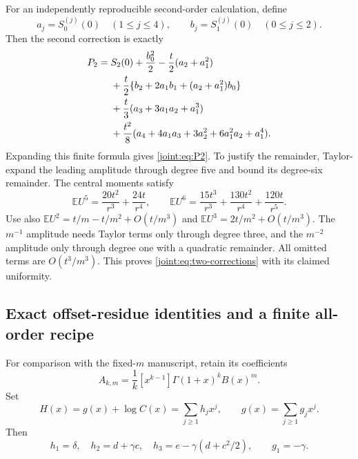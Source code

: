 For an independently reproducible second-order calculation, define
\[
 a_j=S_0^{(j)}(0)\quad(1\leq j\leq4),\qquad
 b_j=S_1^{(j)}(0)\quad(0\leq j\leq2).
\]
Then the second correction is exactly
\begin{align}
 P_2={}&S_2(0)+\frac{b_0^2}{2}
       -\frac t2(a_2+a_1^2)\notag\\
 &+\frac t2\{b_2+2a_1b_1+(a_2+a_1^2)b_0\}\notag\\
 &+\frac t3(a_3+3a_1a_2+a_1^3)\notag\\
 &+\frac{t^2}{8}
     (a_4+4a_1a_3+3a_2^2+6a_1^2a_2+a_1^4).
 \label{joint:eq:P2-derivative}
\end{align}
Expanding this finite formula gives \eqref{joint:eq:P2}.
To justify the remainder, Taylor-expand the leading amplitude through
degree five and bound its degree-six remainder. The central moments
satisfy
\[
 \mathbb EU^5=\frac{20t^2}{r^3}+\frac{24t}{r^4},\qquad
 \mathbb EU^6=\frac{15t^3}{r^3}+\frac{130t^2}{r^4}
                                  +\frac{120t}{r^5}.
\]
Use also
$\mathbb EU^2=t/m-t/m^2+O(t/m^3)$ and
$\mathbb EU^3=2t/m^2+O(t/m^3)$.
The $m^{-1}$ amplitude needs Taylor terms only through degree three,
and the $m^{-2}$ amplitude only through degree one with a quadratic
remainder. All omitted terms are $O(t^3/m^3)$.
This proves \eqref{joint:eq:two-corrections} with its claimed uniformity.

\subsection{Exact offset-residue identities and a finite all-order recipe}

For comparison with the fixed-$m$ manuscript, retain its coefficients
\[
 A_{k,m}=\frac1k[x^{k-1}]\Gamma(1+x)^kB(x)^m.
\]
Set
\[
 H(x)=g(x)+\log C(x)=\sum_{j\geq1}h_jx^j,
 \qquad g(x)=\sum_{j\geq1}g_jx^j.
\]
Then
\[
 h_1=\delta,\quad h_2=d+\gamma c,\quad
 h_3=e-\gamma(d+c^2/2),\qquad g_1=-\gamma.
\]

